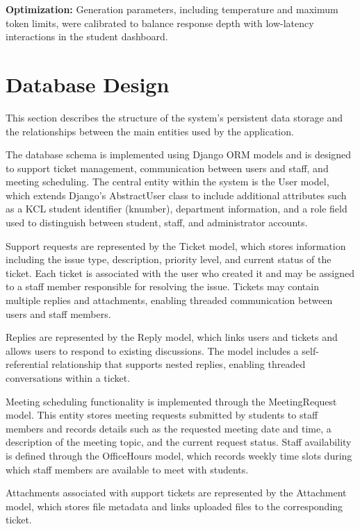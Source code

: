 \textbf{Optimization:} Generation parameters, including temperature and maximum token limits, were calibrated to balance response depth with low-latency interactions in the student dashboard.



\section{Database Design}



This section describes the structure of the system’s persistent data storage and the relationships between the main entities used by the application.

The database schema is implemented using Django ORM models and is designed to support ticket management, communication between users and staff, and meeting scheduling. The central entity within the system is the User model, which extends Django’s AbstractUser class to include additional attributes such as a KCL student identifier (k\textunderscore number), department information, and a role field used to distinguish between student, staff, and administrator accounts.

Support requests are represented by the Ticket model, which stores information including the issue type, description, priority level, and current status of the ticket. Each ticket is associated with the user who created it and may be assigned to a staff member responsible for resolving the issue. Tickets may contain multiple replies and attachments, enabling threaded communication between users and staff members.

Replies are represented by the Reply model, which links users and tickets and allows users to respond to existing discussions. The model includes a self-referential relationship that supports nested replies, enabling threaded conversations within a ticket.

Meeting scheduling functionality is implemented through the MeetingRequest model. This entity stores meeting requests submitted by students to staff members and records details such as the requested meeting date and time, a description of the meeting topic, and the current request status. Staff availability is defined through the OfficeHours model, which records weekly time slots during which staff members are available to meet with students.

Attachments associated with support tickets are represented by the Attachment model, which stores file metadata and links uploaded files to the corresponding ticket.

